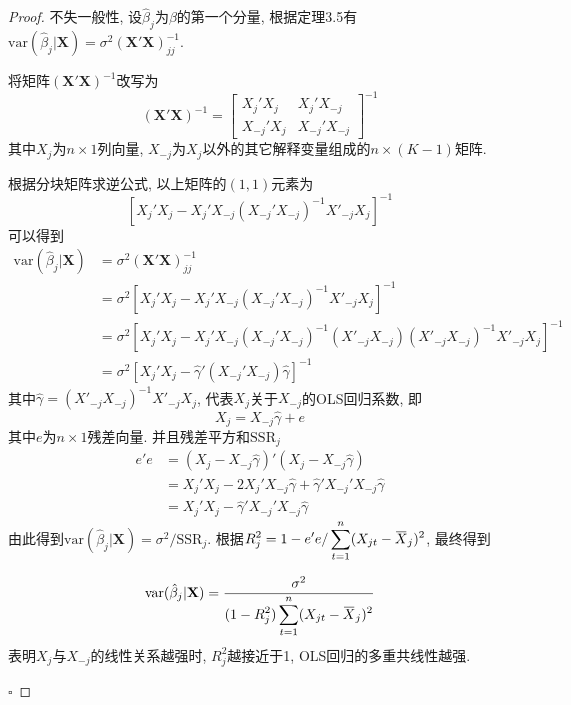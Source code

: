 \documentclass[cn,12pt,math=mtpro2,citestyle=gb7714-2015,bibstyle=gb7714-2015,twocol,mode=simple]{elegantbook}
\newcommand{\overbar}[1]{\mkern 1.5mu\overline{\mkern-1.5mu#1\mkern-1.5mu}\mkern 1.5mu}
\newcommand{\var}{\text{var}}
\newcommand{\hbeta}{\hat{\beta}}
\begin{document}
\begin{proof}
  不失一般性, 设$\hbeta_j$为$\beta$的第一个分量, 根据定理3.5有$\var(\hbeta_j|\mathbf{X})=\sigma^2(\mathbf{X}'\mathbf{X})^{-1}_{jj}$.

  将矩阵$(\mathbf{X}'\mathbf{X})^{-1}$改写为
  $$(\mathbf{X}'\mathbf{X})^{-1}=\begin{bmatrix}
 X_j'X_j & X_j'X_{-j}\\
 X_{-j}'X_j & X_{-j}'X_{-j}
\end{bmatrix}^{-1}$$
其中$X_{j}$为$n\times 1$列向量, $X_{-j}$为$X_j$以外的其它解释变量组成的$n\times (K-1)$矩阵.

根据分块矩阵求逆公式, 以上矩阵的$(1, 1)$元素为
$$[X_j'X_j-X_j'X_{-j}(X_{-j}'X_{-j})^{-1}X'_{-j}X_j]^{-1}$$
可以得到
\begin{align*}
\var(\hbeta_j|\mathbf{X})&=\sigma^2(\mathbf{X}'\mathbf{X})^{-1}_{jj} \\
&=\sigma^2[X_j'X_j-X_j'X_{-j}(X_{-j}'X_{-j})^{-1}X'_{-j}X_j]^{-1} \\
&=\sigma^2[X_j'X_j-X_j'X_{-j}(X_{-j}'X_{-j})^{-1}(X'_{-j}X_{-j})(X'_{-j}X_{-j})^{-1}X'_{-j}X_j]^{-1} \\
&=\sigma^2[X_j'X_j-\hat{\gamma}'(X_{-j}'X_{-j})\hat{\gamma}]^{-1}
\end{align*}
其中$\hat{\gamma}=(X'_{-j}X_{-j})^{-1}X'_{-j}X_j$, 代表$X_j$关于$X_{-j}$的OLS回归系数, 即
$$X_j=X_{-j}\hat{\gamma}+e$$
其中$e$为$n \times 1$残差向量. 并且残差平方和$\text{SSR}_j$
\begin{align*}
e'e&=(X_j-X_{-j}\hat{\gamma})'(X_j-X_{-j}\hat{\gamma}) \\
&=X_j'X_j-2X_j'X_{-j}\hat{\gamma}+\hat{\gamma}'X_{-j}'X_{-j}\hat{\gamma} \\
&=X_j'X_j-\hat{\gamma}'X_{-j}'X_{-j}\hat{\gamma}
\end{align*}
由此得到$\displaystyle \var(\hbeta_j|\mathbf{X})=\sigma^2/\text{SSR}_j$. 根据$\displaystyle R_j^2=1-e'e/\sum_{t=1}^{n}(X_{jt}-\overbar{X}_j)^2$, 最终得到

$$\var(\hbeta_j|\mathbf{X})=\frac{\sigma^2}{\displaystyle(1-R_j^2)\sum_{t=1}^{n}(X_{jt}-\overbar{X}_j)^2}$$
表明$X_j$与$X_{-j}$的线性关系越强时, $R_j^2$越接近于1, OLS回归的多重共线性越强.

$\square$
\end{proof}
\end{document}
